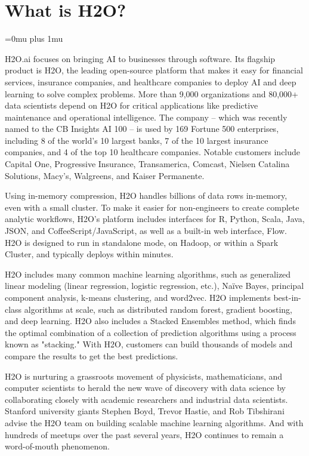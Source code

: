 \documentclass{standalone}
\begin{document}
    \section{What is H2O?}
    \Urlmuskip=0mu plus 1mu\relax %


    H2O.ai focuses on bringing AI to businesses through software.
    Its flagship product is H2O, the leading open-source platform that makes it easy for financial
    services, insurance companies, and healthcare companies to deploy AI and deep learning to solve complex problems.
    More than 9,000 organizations and 80,000+ data scientists depend on H2O for critical applications like predictive
    maintenance and operational intelligence. The company -- which was recently named to the CB Insights AI 100 -- is used
    by 169 Fortune 500 enterprises, including 8 of the world's 10 largest banks, 7 of the 10 largest insurance companies, and
    4 of the top 10 healthcare companies. Notable customers include Capital One, Progressive Insurance, Transamerica, Comcast,
    Nielsen Catalina Solutions, Macy's, Walgreens, and Kaiser Permanente.

    Using in-memory compression, H2O handles billions of data rows in-memory, even with a small cluster. To make it easier
    for non-engineers to create complete analytic workflows, H2O's platform includes interfaces for R, Python, Scala, Java,
    JSON, and CoffeeScript/JavaScript, as well as a built-in web interface, Flow. H2O is designed to run in standalone
    mode, on Hadoop, or within a Spark Cluster, and typically deploys within minutes.

    H2O includes many common machine learning algorithms, such as generalized linear modeling (linear regression, logistic
    regression, etc.), Na\"{i}ve Bayes, principal component analysis, k-means clustering, and word2vec. H2O implements
    best-in-class algorithms at scale, such as distributed random forest, gradient boosting, and deep learning. H2O also
    includes a Stacked Ensembles method, which finds the optimal combination of a collection of prediction algorithms using
    a process known as "stacking." With H2O, customers can build thousands of models and compare the results to get the
    best predictions.

    H2O is nurturing a grassroots movement of physicists, mathematicians, and computer scientists to herald the new wave
    of discovery with data science by collaborating closely with academic researchers and industrial data scientists.
    Stanford university giants Stephen Boyd, Trevor Hastie, and Rob Tibshirani advise the H2O team on building scalable
    machine learning algorithms. And with hundreds of meetups over the past several years, H2O continues to remain
    a word-of-mouth phenomenon.
\end{document}
